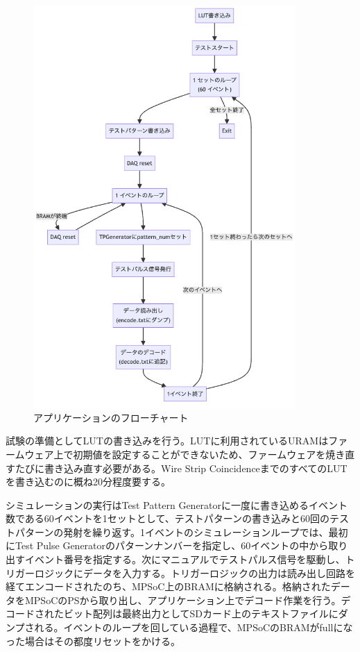 \begin{figure} 
\centering
\includegraphics[width=10cm]{fig/Test/Flowchart.png}
\caption[アプケーションのフローチャート]{アプリケーションのフローチャート}
\label{Flowchart}
\end{figure}

試験の準備としてLUTの書き込みを行う。LUTに利用されているURAMはファームウェア上で初期値を設定することができないため、ファームウェアを焼き直すたびに書き込み直す必要がある。Wire Strip CoincidenceまでのすべてのLUTを書き込むのに概ね20分程度要する。

シミュレーションの実行はTest Pattern Generatorに一度に書き込めるイベント数である60イベントを1セットとして、テストパターンの書き込みと60回のテストパターンの発射を繰り返す。1イベントのシミュレーションループでは、最初にTest Pulse Generatorのパターンナンバーを指定し、60イベントの中から取り出すイベント番号を指定する。次にマニュアルでテストパルス信号を駆動し、トリガーロジックにデータを入力する。トリガーロジックの出力は読み出し回路を経てエンコードされたのち、MPSoC上のBRAMに格納される。格納されたデータをMPSoCのPSから取り出し、アプリケーション上でデコード作業を行う。デコードされたビット配列は最終出力としてSDカード上のテキストファイルにダンプされる。イベントのループを回している過程で、MPSoCのBRAMがfullになった場合はその都度リセットをかける。

